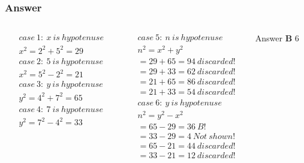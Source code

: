 \documentclass[
	11pt, %
]{beamer}
\begin{document}
\begin{frame}
	\frametitle{Answer}
	\pause
	\begin{columns}[t] 
		\begin{column}{0.33\textwidth} %
			\begin{equation*}
				\begin{aligned}
					&case \ 1:\ x\ is\ hypotenuse\\
					&x^2 = 2^2 + 5^2 = 29\\
					&case \ 2:\ 5\ is\ hypotenuse\\
					&x^2 =  5^2 -2^2 = 21\\	
					&case \ 3:\ y\ is\ hypotenuse\\
					&y^2 =  4^2 + 7^2 = 65\\
					&case \ 4:\ 7\ is\ hypotenuse\\
					&y^2 =   7^2 - 4^2  = 33\\	
				\end{aligned}
			\end{equation*}		
		\end{column}

		\begin{column}{0.33\textwidth} %
			\begin{equation*}
				\begin{aligned}
					&case \ 5:\ n\ is\ hypotenuse\\
					&n^2 =   x^2 + y^2 \\
					&= 29+65 = 94\ discarded!\\
					&= 29+33 = 62\ discarded!\\	
					&= 21+65 = 86\ discarded!\\
					&= 21+33 = 54\ discarded!\\	
					&case\ 6:\ y\ is\ hypotenuse\\
					&n^2 =   y^2 - x^2 \\
					&= 65 - 29= 36\ B!\\
					&= 33-29 = 4\ Not\ shown!\\	
					&= 65 - 21 = 44\ discarded!\\
					&= 33 - 21 = 12\ discarded!\\	
				\end{aligned}
			\end{equation*}			
		\end{column}

		\begin{column}{0.33\textwidth} %
			\pause
			Answer \textbf{B } 6
		\end{column}			
	\end{columns}
\end{frame}
\end{document}
